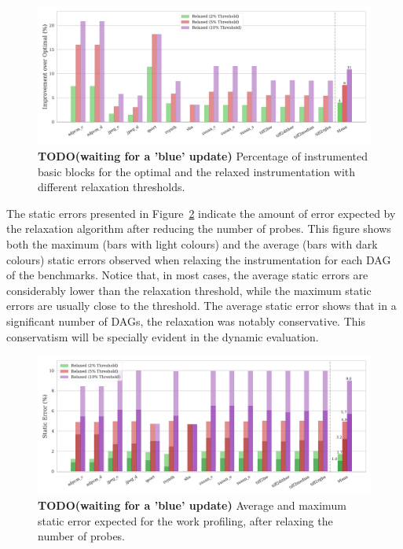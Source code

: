 \begin{figure}[ht]
    \centering
    \includegraphics[width=\textwidth]{figs/num-probes-improvement.pdf}
    \caption{\textbf{TODO(waiting for a 'blue' update)} Percentage of instrumented basic blocks for the optimal and the relaxed instrumentation with different relaxation thresholds.}
    \label{fig:num-probes-improvement}
\end{figure}

The static errors presented in Figure~\ref{fig:static-instr-error} indicate the amount of error expected by the relaxation algorithm after reducing the number of probes.
This figure shows both the maximum (bars with light colours) and the average (bars with dark colours) static errors observed when relaxing the instrumentation for each DAG of the benchmarks.
Notice that, in most cases, the average static errors are considerably lower than the relaxation threshold, while the maximum static errors are usually close to the threshold.
The average static error shows that in a significant number of DAGs, the relaxation was notably conservative.
This conservatism will be specially evident in the dynamic evaluation.

\begin{figure}[ht]
    \centering
    \includegraphics[width=\textwidth]{figs/instr-error.pdf}
    \caption{\textbf{TODO(waiting for a 'blue' update)} Average and maximum static error expected for the work profiling, after relaxing the number of probes.}
    \label{fig:static-instr-error}
\end{figure}

